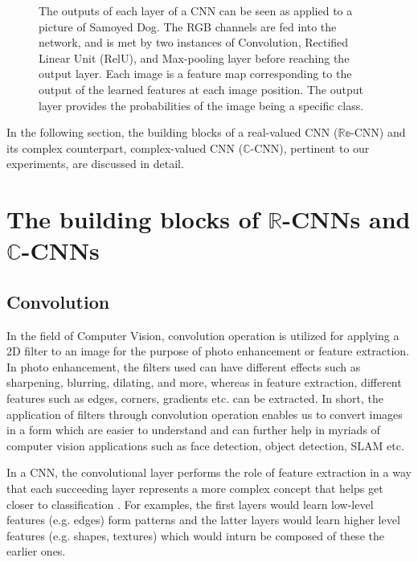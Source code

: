 \begin{figure}[htb]
	\centering
	\epsfxsize=15cm
	{}
	\caption{The outputs of each layer of a CNN can be seen as applied to a picture of Samoyed Dog. The RGB channels are fed into the network, and is met by two instances of Convolution, Rectified Linear Unit (RelU), and Max-pooling layer before reaching the output layer. Each image is a feature map corresponding to the output of the learned features at each image position. The output layer provides the probabilities of the image being a specific class. \cite{bloggg}}
	\label{fig:cnn}
\end{figure}


 
 In the following section, the building blocks of a real-valued CNN ($\mathbb{Re}$-CNN) and its complex counterpart, complex-valued CNN ($\mathbb{C}$-CNN), pertinent to our experiments, are discussed in detail.
 
 \section{The building blocks of $\mathbb{R}$-CNNs and $\mathbb{C}$-CNNs}
 
 
 
 \subsection{Convolution}\label{conv}
  In the field of Computer Vision, convolution operation is utilized for applying a 2D filter to an image for the purpose of photo enhancement or feature extraction. In photo enhancement, the filters used can have different effects such as sharpening, blurring, dilating, and more, whereas in feature extraction, different features such as edges, corners, gradients etc. can be extracted. In short, the application of filters through convolution operation enables us to convert images in a form which are easier to understand and can further help in myriads of computer vision applications such as face detection, object detection, SLAM etc. 
  
  In a CNN, the convolutional layer performs the role of feature extraction in a way that each succeeding layer represents a more complex concept that helps get closer to classification \cite{nature}. For examples, the first layers would learn low-level features (e.g. edges) form patterns and the latter layers would learn higher level features (e.g. shapes, textures) which would inturn be composed of these the earlier ones. 

